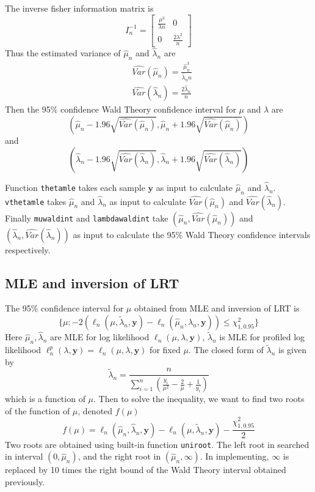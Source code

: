 \documentclass{article}
\begin{document}
    The inverse fisher information matrix is 
    \[I_n^{-1} = \begin{bmatrix}
    	\frac{\mu^3}{\lambda n} & 0 \\
    	0 & \frac{2 \lambda^2}{n}
    \end{bmatrix}\]
    Thus the estimated variance of $\hat{\mu}_n$ and $\hat{\lambda}_n$ are
    \begin{align*}
    & \widehat{Var}(\hat{\mu}_n) = \frac{\hat{\mu}_n^3}{\hat{\lambda}_n n}\\
    & \widehat{Var}(\hat{\lambda}_n) = \frac{2 \hat{\lambda}_n}{n}
    \end{align*}
    Then the 95\% confidence Wald Theory confidence interval for $\mu$ and $\lambda$ are 
    \[\left(\hat{\mu}_n - 1.96 \sqrt{\widehat{Var}(\hat{\mu}_n)}, \hat{\mu}_n + 1.96 \sqrt{\widehat{Var}(\hat{\mu}_n)}\right)\]
    and
    \[\left(\hat{\lambda}_n - 1.96 \sqrt{\widehat{Var}(\hat{\lambda}_n)}, \hat{\lambda}_n + 1.96 \sqrt{\widehat{Var}(\hat{\lambda}_n)}\right)\]

    Function \verb|thetamle| takes each sample $\bm y$ as input to calculate $\hat{\mu}_n$ and $\hat{\lambda}_n$. \verb|vthetamle| takes $\hat{\mu}_n$ and $\hat{\lambda}_n$ as input to calculate $\widehat{Var}(\hat{\mu}_n)$ and $\widehat{Var}(\hat{\lambda}_n)$. Finally \verb|muwaldint| and \verb|lambdawaldint| take $(\hat{\mu}_n, \widehat{Var}(\hat{\mu}_n))$ and $(\hat{\lambda}_n, \widehat{Var}(\hat{\lambda}_n))$ as input to calculate the 95\% Wald Theory confidence intervals respectively.

    
	\subsection{MLE and inversion of LRT}
	The 95\% confidence interval for $\mu$ obtained from MLE and inversion of LRT is
	\[\{\mu : -2(\ell_n(\mu, \tilde{\lambda}_n, \bm y) - \ell_n(\hat{\mu}_n, \hat{\lambda}_n, \bm y)) \leq \chi_{1, 0.95}^2\}\]
	Here $\hat{\mu}_n, \hat{\lambda}_n$ are MLE for log likelihood $\ell_n(\mu, \lambda, \bm y)$, $\tilde{\lambda}_n$ is MLE for profiled log likelihood $\ell_{n}^p (\lambda, \bm y) = \ell_n(\mu, \lambda, \bm y)$ for fixed $\mu$. The closed form of $\tilde{\lambda}_n$ is given by
	\[\tilde{\lambda}_n = \frac{n}{\sum_{i=1}^n \left(\frac{y_i}{\mu^2} - \frac{2}{\mu} + \frac{1}{y_i}\right)}\]
	which is a function of $\mu$. Then to solve the inequality, we want to find two roots of the function of $\mu$, denoted $f(\mu)$
	\[f(\mu) = \ell_n(\hat{\mu}_n, \hat{\lambda}_n, \bm y) - \ell_n({\mu, \tilde{\lambda}_n}, \bm y) - \frac{\chi_{1,0.95}^2}{2}\]
	Two roots are obtained using built-in function \verb|uniroot|. The left root in searched in interval $(0, \hat{\mu}_n)$, and the right root in $(\hat{\mu}_n, \infty)$. In implementing, $\infty$ is replaced by 10 times the right bound of the Wald Theory interval obtained previously.
\end{document}
